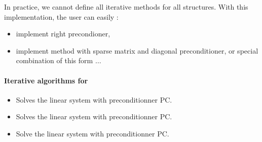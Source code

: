 In practice, we cannot define all iterative methods for all structures.
With this implementation, the user can easily :
\begin{itemize}
\item implement right precondioner, 
\item implement method with sparse matrix and diagonal preconditioner, or
  special combination of this form $\dots$
\end{itemize}


\paragraph{Iterative algorithms for }


\begin{itemize}
\item {}
  \sshortdescribe Solves the linear system  with preconditionner PC.  
\item {}
  \sshortdescribe Solves the linear system  with preconditionner PC.  
\item {}
  \sshortdescribe Solve the linear system  with preconditionner PC.
\end{itemize}



